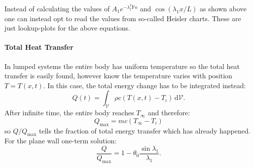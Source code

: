 Instead of calculating the values of $A_1 e^{-\lambda_1^2 \mathrm{Fo}}$ and $\cos (\lambda_1 x / L)$ as shown above one can instead opt to read the values from so-called Heisler charts.
These are just lookup-plots for the above equations.

\paragraph{Total Heat Transfer}
In lumped systems the entire body has uniform temperature so the total heat transfer is easily found, however know the temperature varies with position $T = T(x,t)$.
In this case, the total energy change has to be integrated instead:
\begin{equation*}
  Q(t) = \int_{\mathscr{V}} \rho c \left( T(x,t) - T_i \right) \, \mathrm{d}\mathscr{V}
.\end{equation*}
After infinite time, the entire body reaches $T_{\infty}$ and therefore:
\begin{equation*}
  Q_{\mathrm{max}} = mc \left( T_{\infty} - T_i \right)
\end{equation*}
so $Q / Q_{\text{max}}$ tells the fraction of total energy transfer which has already happened.
For the plane wall one-term solution:
\begin{equation*}
  \frac{Q}{Q_{\text{max}}} = 1  - \theta_0 \frac{\sin \lambda_1}{\lambda_1}
.\end{equation*}
